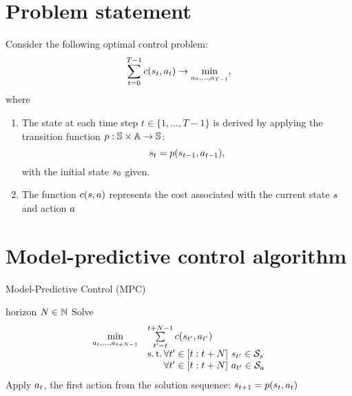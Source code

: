 \documentclass[12pt,twoside]{../../mitthesis}
\begin{document}
\section*{Problem statement}
Consider the following optimal control problem:
$$
    \sum_{t = 0}^{T-1}c(s_{t}, a_{t}) \rightarrow \min_{a_0, \ldots, a_{T-1}},
$$
where
\begin{enumerate}
    \item The state at each time step $t \in \{1, \ldots, T-1\}$ is derived by applying the transition function $p: \mathbb S \times \mathbb A \to \mathbb S$: 
    $$
        s_{t} = p(s_{t-1}, a_{t-1}),
    $$ 
    with the initial state $s_0$ given.
    \item The function $c(s, a)$ represents the cost associated with the current state $s$ and action $a$
\end{enumerate}

\section*{Model-predictive control algorithm}
\begin{algorithm}
    \caption{Model-Predictive Control (MPC)}
    \label{alg:my-alg}
    \begin{algorithmic}
         horizon $N \in {\mathbb{N}}$        
            \STATE Solve 
            \[
                \begin{array}{ll}
                    \min \limits_{\action_t, \dots, \action_{t+N-1}} & \sum \limits_{t^\prime=t}^{t+N-1} \cost( \state_{t^\prime}, \action_{t^\prime} ) \\
                    & \sut \forall t^\prime \in [t:t+N] \spc \state_{t^\prime} \in \safeset_\state \\
                    & \hphantom{\sut} \forall t^\prime \in [t:t+N] \spc \action_{t^\prime} \in \safeset_\action
                \end{array}
            \]    
            \STATE Apply $a_t$, the first action from the solution sequence: $s_{t+1} = p(s_t, a_t)$
        \ENDFOR
    \end{algorithmic}  
\end{algorithm}
\end{document}
